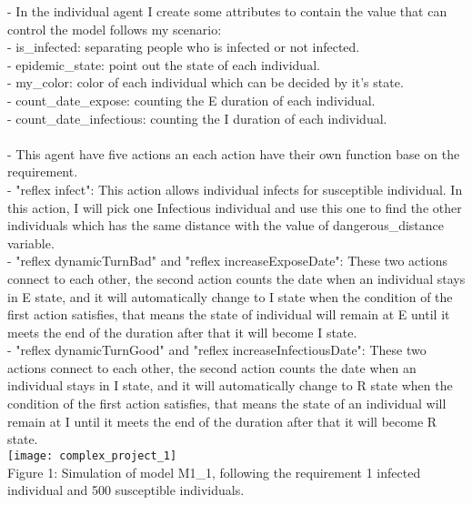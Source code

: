 \documentclass{article}
\begin{document}
- In the individual agent I create some attributes to contain the value that can control the model follows my scenario:
\\
- is\_infected: separating people who is infected or not infected.
\\
- epidemic\_state: point out the state of each individual.
\\
-	my\_color: color of each individual which can be decided by it's state.
\\
-	count\_date\_expose: counting the E duration of each individual.
\\
- count\_date\_infectious: counting the I duration of each individual.
\\\\
- This agent have five actions an each action have their own function base on the requirement.
\\
- "reflex infect": This action allows individual infects for susceptible individual. In this action, I will pick one Infectious individual and use this one to find the other individuals which has the same distance with the value of dangerous\_distance variable.
\\
- "reflex dynamicTurnBad" and "reflex increaseExposeDate": These two actions connect to each other, the second action counts the date when an individual stays in E state, and it will automatically change to I state when the condition of the first action satisfies, that means the state of individual will remain at E until it meets the end of the duration after that it will become I state.
\\
- "reflex dynamicTurnGood" and "reflex increaseInfectiousDate": These two actions connect to each other, the second action counts the date when an individual stays in I state, and it will automatically change to R state when the condition of the first action satisfies, that means the state of an individual will remain at I until it meets the end of the duration after that it will become R state.
\\
\texttt{[image: complex\_project\_1]}
\\
\caption{Figure 1: Simulation of model M1\_1, following the requirement 1 infected individual and 500 susceptible individuals.}
\end{document}
